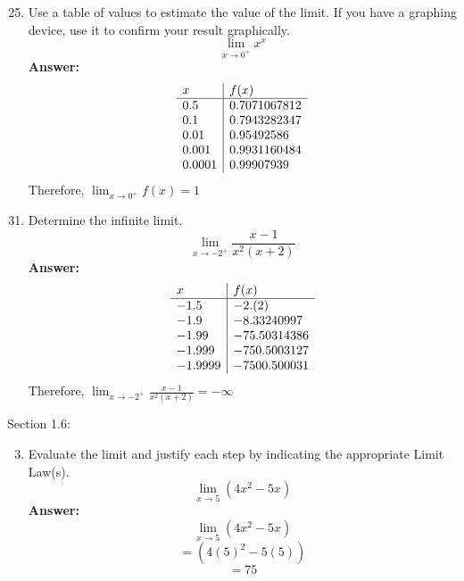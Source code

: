 \documentclass[12pt]{article}
\begin{document}
\begin{enumerate}
\setcounter{enumi}{24}
    \item Use a table of values to estimate the value of the limit. If you have a graphing device, use it to confirm your result graphically.
    \[ \lim_{x\to 0^+} x^x\]
    \textbf{Answer: }
    \begin{displaymath}
        \begin{array}{l|l c|c|c|c|c|}
        x & f(x) \\%
        \hline %
        0.5 & 0.7071067812 \\
        0.1 & 0.7943282347 \\
        0.01 & 0.95492586 \\
        0.001 & 0.9931160484 \\
        0.0001 & 0.99907939 \\
        \end{array}
    \end{displaymath}
    Therefore, $\boxed{\displaystyle{\lim_{x \to 0^+} f(x) = 1}}$
\end{enumerate}

\newpage
\begin{enumerate}
\setcounter{enumi}{30}
    \item Determine the infinite limit.
    \[ {\displaystyle\lim_{x\to -2^+} \frac{x-1}{x^2(x+2)}} \]
    \textbf{Answer: }
    \begin{displaymath}
        \begin{array}{l|l c|c|c|c|c|}
        x & f(x) \\%
        \hline %
        -1.5 & -2.(2)\\
        -1.9 & -8.33240997 \\
        -1.99 & -75.50314386 \\
        -1.999 & -750.5003127 \\
        -1.9999 & -7500.500031 \\
        \end{array}
    \end{displaymath}
    Therefore, $\boxed{\displaystyle{\lim_{x\to -2^+} \frac{x-1}{x^2(x+2)} = - \infty}}$
\end{enumerate}

Section 1.6:

\begin{enumerate}
\setcounter{enumi}{2}
    \item Evaluate the limit and justify each step by indicating the appropriate Limit Law(s).
    \[ {\displaystyle\lim_{x\to 5} (4x^2 - 5x)} \]
\textbf{Answer: }
\[ {\displaystyle\lim_{x\to 5} (4x^2 - 5x)} \]
\[ = { (4(5)^2 - 5(5))} \]
\[ \boxed{= 75} \]
\end{enumerate}
\end{document}
